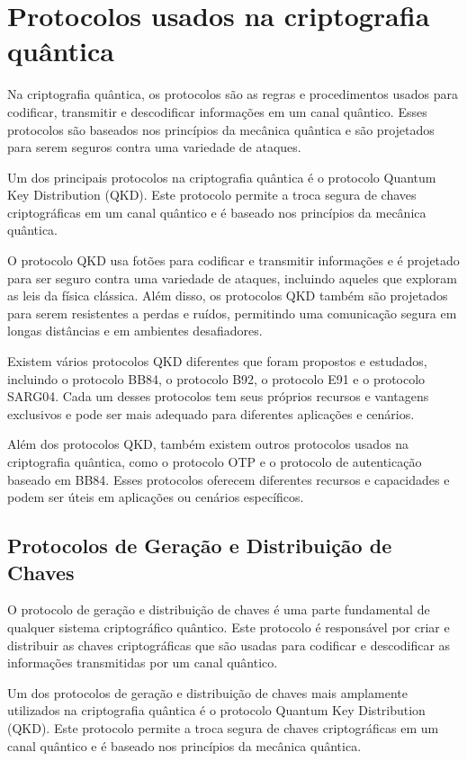 \chapter{Protocolos usados na criptografia quântica}

Na criptografia quântica, os protocolos são as regras e procedimentos usados para codificar, transmitir e descodificar informações em um canal quântico. Esses protocolos são baseados nos princípios da mecânica quântica e são projetados para serem seguros contra uma variedade de ataques.

Um dos principais protocolos na criptografia quântica é o protocolo Quantum Key Distribution (QKD). Este protocolo permite a troca segura de chaves criptográficas em um canal quântico e é baseado nos princípios da mecânica quântica.

O protocolo QKD usa fotões para codificar e transmitir informações e é projetado para ser seguro contra uma variedade de ataques, incluindo aqueles que exploram as leis da física clássica. Além disso, os protocolos QKD também são projetados para serem resistentes a perdas e ruídos, permitindo uma comunicação segura em longas distâncias e em ambientes desafiadores.

Existem vários protocolos QKD diferentes que foram propostos e estudados, incluindo o protocolo BB84, o protocolo B92, o protocolo E91 e o protocolo SARG04. Cada um desses protocolos tem seus próprios recursos e vantagens exclusivos e pode ser mais adequado para diferentes aplicações e cenários.

Além dos protocolos QKD, também existem outros protocolos usados na criptografia quântica, como o protocolo OTP e o protocolo de autenticação baseado em BB84. Esses protocolos oferecem diferentes recursos e capacidades e podem ser úteis em aplicações ou cenários específicos.

\section{Protocolos de Geração e Distribuição de Chaves}

O protocolo de geração e distribuição de chaves é uma parte fundamental de qualquer sistema criptográfico quântico. Este protocolo é responsável por criar e distribuir as chaves criptográficas que são usadas para codificar e descodificar as informações transmitidas por um canal quântico.

Um dos protocolos de geração e distribuição de chaves mais amplamente utilizados na criptografia quântica é o protocolo Quantum Key Distribution (QKD). Este protocolo permite a troca segura de chaves criptográficas em um canal quântico e é baseado nos princípios da mecânica quântica.


